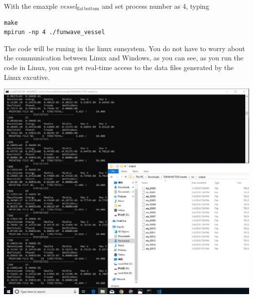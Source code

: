 \documentclass[11pt]{article}
\begin{document}
With the emaxple \emph{vessel\(_{\text{flat}}\)\(_{\text{bottom}}\)} and set process number as 4, typing 

\begin{verbatim}
make
mpirun -np 4 ./funwave_vessel
\end{verbatim}

The code will be runing in the linux sunsystem. You do not have to worry about
the communication between Linux and Windows, as you can see, as you run the code
in Linux, you can get real-time access to the data files generated by the Linux
excutive.
\begin{center}
\includegraphics[width=.9\linewidth]{./funwave_img/8.JPG}
\end{center}
\end{document}
